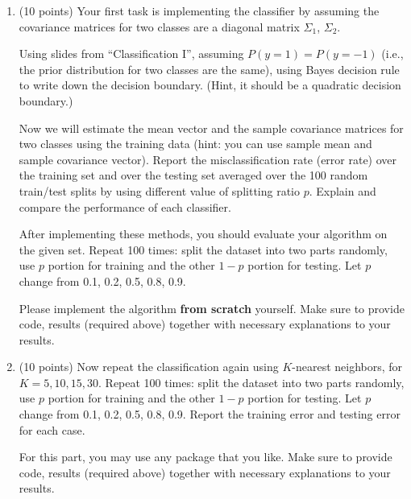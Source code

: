 \documentclass[a4paper,12pt,fleqn]{article}
\begin{document}
\begin{enumerate}
\item (10 points)
Your first task is implementing the classifier by assuming the covariance matrices for two classes are a diagonal matrix $\Sigma_1$, $\Sigma_ 2$. 

Using slides from ``Classification I'', assuming $P(y=1) = P(y=-1)$ (i.e., the prior distribution for two classes are the same), using Bayes decision rule to write down the decision boundary. (Hint, it should be a quadratic decision boundary.)

Now we will estimate the mean vector and the sample covariance matrices for two classes using the training data (hint: you can use sample mean and sample covariance vector). Report the misclassification rate (error rate) over the training set and over the testing set averaged over the 100 random train/test splits by using different value of splitting ratio $p$. Explain and compare the performance of each classifier.

After implementing these methods, you should evaluate your algorithm on the given set. Repeat 100 times: split the dataset into two parts randomly, use $p$ portion for training and the other $1 - p$ portion for testing. Let $p$ change from 0.1, 0.2, 0.5, 0.8, 0.9.

Please implement the algorithm {\bf from scratch} yourself. Make sure to provide code, results (required above) together with necessary explanations to your results. 

\item (10 points) Now repeat the classification again using $K$-nearest neighbors, for $K = 5, 10, 15, 30$.  Repeat 100 times: split the dataset into two parts randomly, use $p$ portion for training and the other $1 - p$ portion for testing. Let $p$ change from 0.1, 0.2, 0.5, 0.8, 0.9. Report the training error and testing error for each case.

For this part, you may use any package that you like.  Make sure to provide code, results (required above) together with necessary explanations to your results. 

\end{enumerate}


\label{finalpage}
\end{document}
